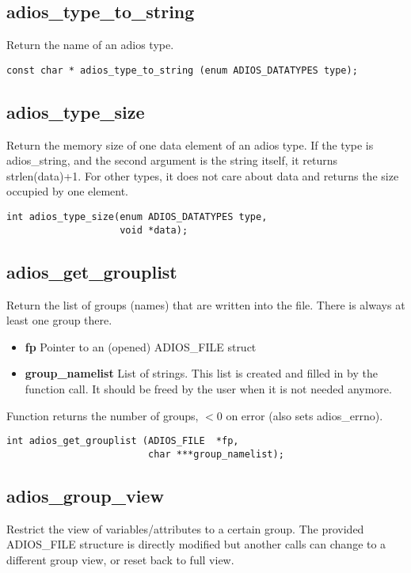 \subsection{adios\_type\_to\_string}
 Return the name of an adios type. 

\begin{lstlisting}[alsolanguage=C]
const char * adios_type_to_string (enum ADIOS_DATATYPES type);
\end{lstlisting}


\subsection{adios\_type\_size}
Return the memory size of one data element of an adios type.
If the type is adios\_string, and the second argument is
the string itself, it returns strlen(data)+1. 
For other types, it does not care about data and returns
the size occupied by one element.

\begin{lstlisting}[alsolanguage=C]
int adios_type_size(enum ADIOS_DATATYPES type, 
                    void *data);
\end{lstlisting}


\subsection{adios\_get\_grouplist}
Return the list of groups (names) that are written into
the file. There is always at least one group there.

\begin{itemize}
\item{\bf fp} Pointer to an (opened) ADIOS\_FILE struct
\item{\bf group\_namelist} List of strings. This list is created and filled in by the function call. It should be freed by the user when it is not needed anymore.
\end{itemize}

Function returns the number of groups, $<0$ on error (also sets adios\_errno).

\begin{lstlisting}[alsolanguage=C]
int adios_get_grouplist (ADIOS_FILE  *fp, 
                         char ***group_namelist);
\end{lstlisting}


\subsection{adios\_group\_view}
Restrict the view of variables/attributes to a certain group.
The provided ADIOS\_FILE structure is directly modified but
another calls can change to a different group view, or reset
back to full view.

